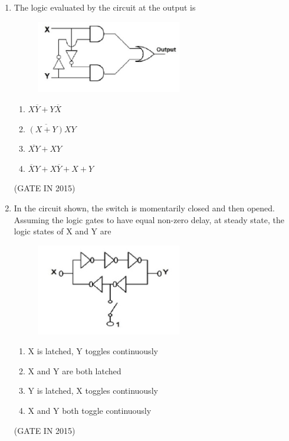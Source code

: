 \documentclass[journal]{IEEEtran}
\begin{document}
\begin{enumerate}
\item The logic evaluated by the circuit at the output is
\begin{figure}[H]
    \centering
      \includegraphics[width=0.6\textwidth]{7.png} 
      \caption{}
    \label{fig:fig7} 
\end{figure}
\begin{multicols}{4}
\begin{enumerate}
\item $X\overline{Y} + Y\overline{X}$
\item $\overline{(X+Y)}XY$
\item $\overline{XY} + XY$
\item $\overline{X}Y + X\overline{Y}+ X + Y$
\end{enumerate}
  \end{multicols} \hfill(GATE IN 2015)

\item In the circuit shown, the switch is momentarily closed and then opened. Assuming the logic gates to have equal non-zero delay, at steady state, the logic states of X and Y are
\begin{figure}[H]
    \centering
      \includegraphics[width=0.6\textwidth]{8.png} 
      \caption{}
    \label{fig:fig8} 
\end{figure}
\begin{multicols}{2}
\begin{enumerate}
\item X is latched, Y toggles continuously
\item X and Y are both latched
\item Y is latched, X toggles continuously
\item X and Y both toggle continuously
\end{enumerate}
  \end{multicols} \hfill(GATE IN 2015)


\end{enumerate}
\end{document}

